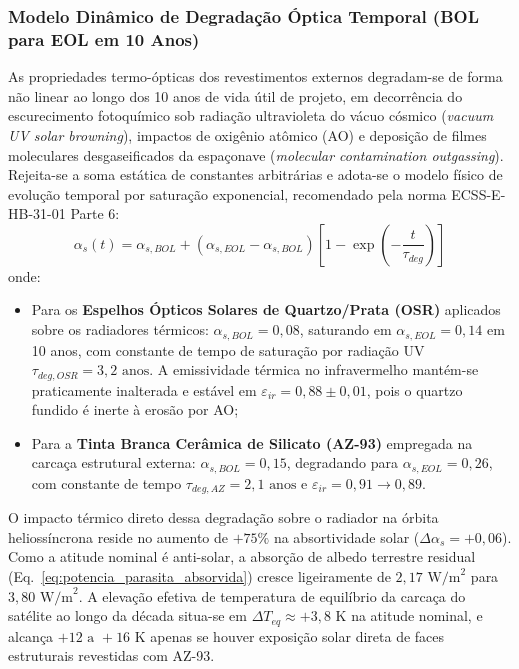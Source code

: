 \subsubsection{Modelo Dinâmico de Degradação Óptica Temporal (BOL para EOL em 10 Anos)}

As propriedades termo-ópticas dos revestimentos externos degradam-se de forma não linear ao longo dos 10 anos de vida útil de projeto, em decorrência do escurecimento fotoquímico sob radiação ultravioleta do vácuo cósmico (\textit{vacuum UV solar browning}), impactos de oxigênio atômico (AO) e deposição de filmes moleculares desgaseificados da espaçonave (\textit{molecular contamination outgassing}). Rejeita-se a soma estática de constantes arbitrárias e adota-se o modelo físico de evolução temporal por saturação exponencial, recomendado pela norma ECSS-E-HB-31-01 Parte 6:
\begin{equation}
    \alpha_s(t) = \alpha_{s,BOL} + \left( \alpha_{s,EOL} - \alpha_{s,BOL} \right) \left[ 1 - \exp\left( -\frac{t}{\tau_{deg}} \right) \right]
    \label{eq:lei_degradacao_optica_temporal}
\end{equation}
onde:
\begin{itemize}[leftmargin=*]
    \item Para os \textbf{Espelhos Ópticos Solares de Quartzo/Prata (OSR)} aplicados sobre os radiadores térmicos: $\alpha_{s,BOL} = 0{,}08$, saturando em $\alpha_{s,EOL} = 0{,}14$ em 10 anos, com constante de tempo de saturação por radiação UV $\tau_{deg,OSR} = 3{,}2\text{ anos}$. A emissividade térmica no infravermelho mantém-se praticamente inalterada e estável em $\varepsilon_{ir} = 0{,}88 \pm 0{,}01$, pois o quartzo fundido é inerte à erosão por AO;
    \item Para a \textbf{Tinta Branca Cerâmica de Silicato (AZ-93)} empregada na carcaça estrutural externa: $\alpha_{s,BOL} = 0{,}15$, degradando para $\alpha_{s,EOL} = 0{,}26$, com constante de tempo $\tau_{deg,AZ} = 2{,}1\text{ anos}$ e $\varepsilon_{ir} = 0{,}91 \rightarrow 0{,}89$.
\end{itemize}

O impacto térmico direto dessa degradação sobre o radiador na órbita heliossíncrona reside no aumento de $+75\%$ na absortividade solar ($\Delta \alpha_s = +0{,}06$). Como a atitude nominal é anti-solar, a absorção de albedo terrestre residual (Eq.~\ref{eq:potencia_parasita_absorvida}) cresce ligeiramente de $2{,}17\text{ W/m}^2$ para $3{,}80\text{ W/m}^2$. A elevação efetiva de temperatura de equilíbrio da carcaça do satélite ao longo da década situa-se em $\Delta T_{eq} \approx +3{,}8\text{ K}$ na atitude nominal, e alcança $+12\text{ a }+16\text{ K}$ apenas se houver exposição solar direta de faces estruturais revestidas com AZ-93.

